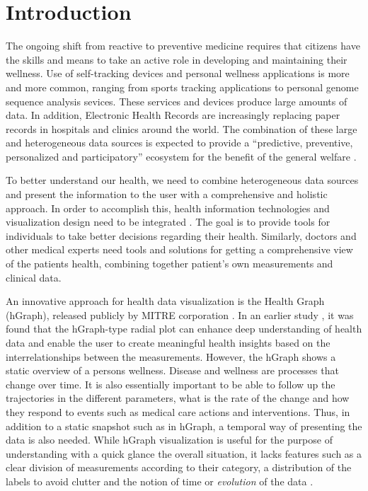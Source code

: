 \documentclass[twocolumn]{bmcart}%
\begin{document}


\section*{Introduction}
The ongoing shift from reactive to preventive medicine requires that citizens have the skills and means to take an active role in developing and maintaining their wellness. Use of self-tracking devices and personal wellness applications is more and more common, ranging from sports tracking applications to personal genome sequence analysis sevices. These services and devices produce large amounts of data. In addition, Electronic Health Records are increasingly replacing paper records in hospitals and clinics around the world. The combination of these large and heterogeneous data sources is expected to provide a ``predictive, preventive, personalized and participatory'' ecosystem for the benefit of the general welfare \cite{Hood2012613}.

To better understand our health, we need to combine heterogeneous data sources and present the information to the user with a comprehensive and holistic approach. In order to accomplish this, health information technologies and visualization design need to be integrated \cite{lesselroth2011data}. The goal is to provide tools for individuals to take better  decisions regarding their health. Similarly, doctors and other medical experts need tools and solutions for getting a comprehensive view of the patients health, combining together patient's own measurements and clinical data.

An innovative approach for health data visualization is the Health Graph (hGraph), released publicly by MITRE corporation \cite{follett2012hgraph}. In an earlier study \cite{EMBCLedNiem}, it was found that the hGraph-type radial plot can enhance deep understanding of health data and enable the user to create meaningful health insights based on the interrelationships between the measurements. However, the hGraph shows a static overview of a persons wellness. Disease and wellness are processes that change over time. It is also essentially important to be able to follow up the trajectories in the different parameters, what is the rate of the change and how they respond to events such as medical care actions and interventions. Thus, in addition to a static snapshot such as in hGraph, a temporal way of presenting the data is also needed. While hGraph visualization is useful for the purpose of understanding with a quick glance the overall situation, it lacks features such as a clear division of measurements according to their category, a distribution of the labels to avoid clutter and the notion of time or \textit{evolution} of the data \cite{EMBCLedNiem}. 
\end{document}
